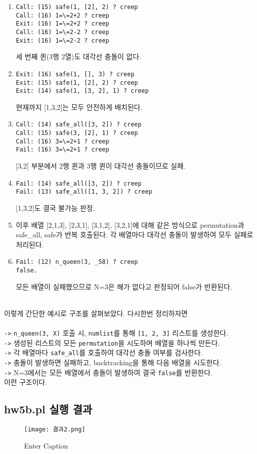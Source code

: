 \documentclass{article}
\begin{document}
\begin{enumerate}
\item
\begin{verbatim}
Call: (15) safe(1, [2], 2) ? creep
Call: (16) 1=\=2+2 ? creep
Exit: (16) 1=\=2+2 ? creep
Call: (16) 1=\=2-2 ? creep
Exit: (16) 1=\=2-2 ? creep
\end{verbatim}
세 번째 퀸(3행 2열)도 대각선 충돌이 없다.

\item
\begin{verbatim}
Exit: (16) safe(1, [], 3) ? creep
Exit: (15) safe(1, [2], 2) ? creep
Exit: (14) safe(1, [3, 2], 1) ? creep
\end{verbatim}
현재까지 [1,3,2]는 모두 안전하게 배치된다.

\item
\begin{verbatim}
Call: (14) safe_all([3, 2]) ? creep
Call: (15) safe(3, [2], 1) ? creep
Call: (16) 3=\=2+1 ? creep
Fail: (16) 3=\=2+1 ? creep
\end{verbatim}
[3,2] 부분에서 2행 퀸과 3행 퀸이 대각선 충돌이므로 실패.

\item
\begin{verbatim}
Fail: (14) safe_all([3, 2]) ? creep
Fail: (13) safe_all([1, 3, 2]) ? creep
\end{verbatim}
[1,3,2]도 결국 불가능 판정.

\item
이후 배열 [2,1,3], [2,3,1], [3,1,2], [3,2,1]에 대해 같은 방식으로 permutation과 safe\_all, safe가 반복 호출된다.  
각 배열마다 대각선 충돌이 발생하여 모두 실패로 처리된다.

\item
\begin{verbatim}
Fail: (12) n_queen(3, _58) ? creep
false.
\end{verbatim}
모든 배열이 실패했으므로 N=3은 해가 없다고 판정되어 false가 반환된다. \\ \\

\end{enumerate}


이렇게 간단한 예시로 구조를 살펴보았다. 다시한번 정리하자면 \\ \\
\texttt{->} \texttt{n\_queen(3, X)} 호출 시, \texttt{numlist}를 통해 \texttt{[1, 2, 3]} 리스트를 생성한다. \\
\texttt{->} 생성된 리스트의 모든 \texttt{permutation}을 시도하며 배열을 하나씩 만든다.\\
\texttt{->} 각 배열마다 \texttt{safe\_all}를 호출하여 대각선 충돌 여부를 검사한다. \\
\texttt{->} 충돌이 발생하면 실패하고, backtracking을 통해 다음 배열을 시도한다. \\
\texttt{->} N=3에서는 모든 배열에서 충돌이 발생하여 결국 \texttt{false}를 반환한다. \\


이런 구조이다.


\subsection{hw5b.pl 실행 결과}

\begin{figure} [H]
    \centering
    \texttt{[image: 결과2.png]}
    \caption{Enter Caption}
    \label{fig:enter-label}
\end{figure}
\end{document}
